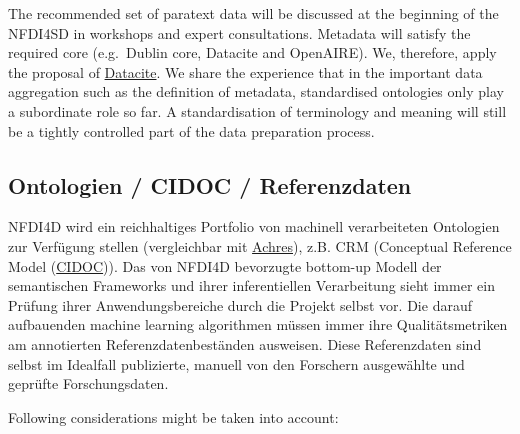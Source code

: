 \documentclass[
  english,
  paper=a4,
  oneside,captions=tableheading
]{scrbook}
\begin{document}
The recommended set of paratext data will be discussed at the beginning
of the NFDI4SD in workshops and expert consultations. Metadata will
satisfy the required core (e.g.~Dublin core, Datacite and OpenAIRE). We,
therefore, apply the proposal of
\href{http://schema.datacite.org/meta/kernel-4.3/doc/DataCite-MetadataKernel_v4.3.pdf}{Datacite}.
We share the experience that in the important data aggregation such as
the definition of metadata, standardised ontologies only play a
subordinate role so far. A standardisation of terminology and meaning
will still be a tightly controlled part of the data preparation process.

\hypertarget{ontologien-cidoc-referenzdaten}{%
\subsection{Ontologien / CIDOC /
Referenzdaten}\label{ontologien-cidoc-referenzdaten}}

NFDI4D wird ein reichhaltiges Portfolio von machinell verarbeiteten
Ontologien zur Verfügung stellen (vergleichbar mit
\href{https://arches.readthedocs.io/en/latest/ontologies-in-arches/}{Achres}),
z.B. CRM (Conceptual Reference Model
(\href{http://www.cidoc-crm.org/}{CIDOC})). Das von NFDI4D bevorzugte
bottom-up Modell der semantischen Frameworks und ihrer inferentiellen
Verarbeitung sieht immer ein Prüfung ihrer Anwendungsbereiche durch die
Projekt selbst vor. Die darauf aufbauenden machine learning algorithmen
müssen immer ihre Qualitätsmetriken am annotierten
Referenzdatenbeständen ausweisen. Diese Referenzdaten sind selbst im
Idealfall publizierte, manuell von den Forschern ausgewählte und
geprüfte Forschungsdaten.

Following considerations might be taken into account:
\end{document}
